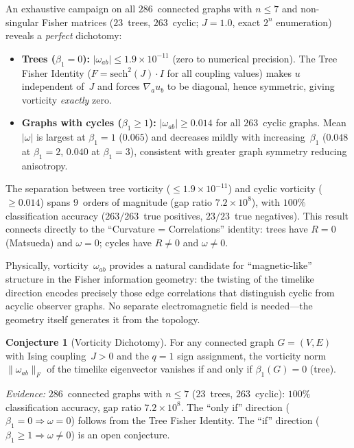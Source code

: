 \documentclass[11pt]{article}
\theoremstyle{definition}
\newtheorem{conjecture}[theorem]{Conjecture}
\theoremstyle{remark}
\begin{document}
An exhaustive campaign on all $286$~connected graphs with $n \leq 7$ and
non-singular Fisher matrices ($23$~trees, $263$~cyclic; $J = 1.0$,
exact $2^n$ enumeration) reveals a \emph{perfect} dichotomy:
\begin{itemize}
  \item \textbf{Trees ($\beta_1 = 0$):} $|\omega_{ab}| \leq 1.9 \times 10^{-11}$
    (zero to numerical precision). The Tree Fisher Identity
    ($F = \mathrm{sech}^2(J) \cdot I$ for all coupling values)
    makes $u$ independent of~$J$ and forces $\nabla_a u_b$ to be
    diagonal, hence symmetric, giving vorticity \emph{exactly} zero.
  \item \textbf{Graphs with cycles ($\beta_1 \geq 1$):}
    $|\omega_{ab}| \geq 0.014$ for all $263$~cyclic graphs.
    Mean $|\omega|$ is largest at $\beta_1 = 1$ ($0.065$)
    and decreases mildly with increasing~$\beta_1$
    ($0.048$ at $\beta_1 = 2$, $0.040$ at $\beta_1 = 3$),
    consistent with greater graph symmetry reducing anisotropy.
\end{itemize}
The separation between tree vorticity (${\leq}1.9 \times 10^{-11}$) and cyclic
vorticity (${\geq}0.014$) spans $9$~orders of magnitude (gap ratio
$7.2 \times 10^{8}$), with $100\%$ classification accuracy ($263/263$~true
positives, $23/23$~true negatives). This result connects directly to the
``Curvature = Correlations'' identity: trees have $R = 0$ (Matsueda) and
$\omega = 0$; cycles have $R \neq 0$ and $\omega \neq 0$.

Physically, vorticity~$\omega_{ab}$ provides a natural candidate for
``magnetic-like'' structure in the Fisher information geometry: the
twisting of the timelike direction encodes precisely those edge
correlations that distinguish cyclic from acyclic observer graphs.
No separate electromagnetic field is needed---the geometry itself
generates it from the topology.

\begin{conjecture}[Vorticity Dichotomy]
\label{conj:vorticity}
For any connected graph $G = (V, E)$ with Ising coupling~$J > 0$ and
the $q = 1$ sign assignment, the vorticity norm $\|\omega_{ab}\|_F$ of
the timelike eigenvector vanishes if and only if $\beta_1(G) = 0$ (tree).
\end{conjecture}

\noindent\emph{Evidence:} $286$~connected graphs with $n \leq 7$
($23$~trees, $263$~cyclic): $100\%$ classification accuracy, gap ratio
$7.2 \times 10^{8}$. The ``only if'' direction ($\beta_1 = 0 \Rightarrow
\omega = 0$) follows from the Tree Fisher Identity. The ``if'' direction
($\beta_1 \geq 1 \Rightarrow \omega \neq 0$) is an open conjecture.
\end{document}
